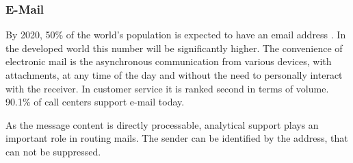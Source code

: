 		\subsubsection{E-Mail}
		
		By 2020, 50\% of the world's population is expected to have an email address \citep{radial2016}. In the developed world this number will be significantly higher. The convenience of electronic mail is the asynchronous communication from various devices, with attachments, at any time of the day and without the need to personally interact with the receiver. In customer service it is ranked second in terms of volume. 90.1\% of call centers support e-mail \citep{dimensiondata2016} today. %
		
		As the message content is directly processable, analytical support plays an important role in routing mails. The sender can be identified by the address, that can not be suppressed. 
		\todo{+++}
